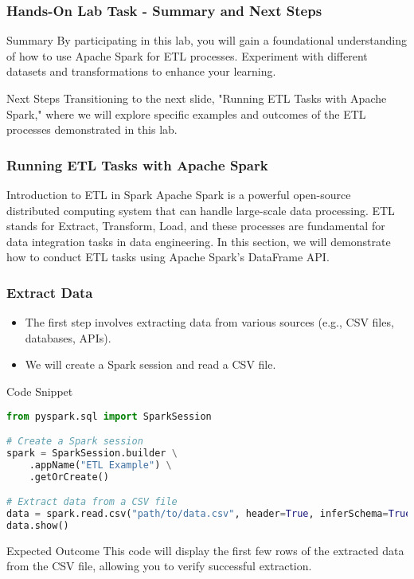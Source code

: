 \documentclass[aspectratio=169]{beamer}
\begin{document}
\begin{frame}[fragile]
    \frametitle{Hands-On Lab Task - Summary and Next Steps}
    \begin{block}{Summary}
        By participating in this lab, you will gain a foundational understanding of how to use Apache Spark for ETL processes. 
        Experiment with different datasets and transformations to enhance your learning.
    \end{block}
    
    \begin{block}{Next Steps}
        Transitioning to the next slide, "Running ETL Tasks with Apache Spark," 
        where we will explore specific examples and outcomes of the ETL processes demonstrated in this lab.
    \end{block}
\end{frame}

\begin{frame}
    \frametitle{Running ETL Tasks with Apache Spark}
    \begin{block}{Introduction to ETL in Spark}
        Apache Spark is a powerful open-source distributed computing system that can handle large-scale data processing. 
        ETL stands for Extract, Transform, Load, and these processes are fundamental for data integration tasks in data engineering. 
        In this section, we will demonstrate how to conduct ETL tasks using Apache Spark’s DataFrame API.
    \end{block}
\end{frame}

\begin{frame}[fragile]
    \frametitle{Extract Data}
    \begin{itemize}
        \item The first step involves extracting data from various sources (e.g., CSV files, databases, APIs).
        \item We will create a Spark session and read a CSV file.
    \end{itemize}
    
    \begin{block}{Code Snippet}
    \begin{lstlisting}[language=Python]
from pyspark.sql import SparkSession

# Create a Spark session
spark = SparkSession.builder \
    .appName("ETL Example") \
    .getOrCreate()

# Extract data from a CSV file
data = spark.read.csv("path/to/data.csv", header=True, inferSchema=True)
data.show()
    \end{lstlisting}
    \end{block}
    
    \begin{block}{Expected Outcome}
        This code will display the first few rows of the extracted data from the CSV file, allowing you to verify successful extraction.
    \end{block}
\end{frame}
\end{document}
